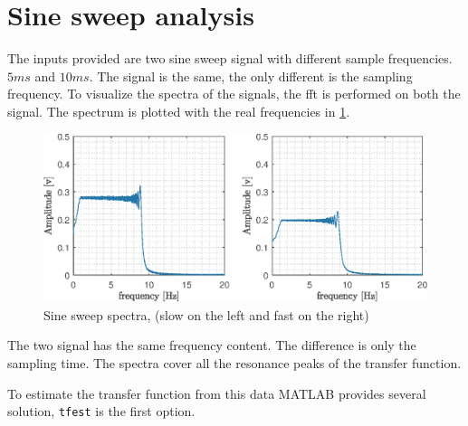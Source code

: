 \documentclass[twosided,a4paper]{article}           %
\begin{document}
\section{Sine sweep analysis}
The inputs provided are two sine sweep signal with different sample frequencies. $5 ms$ and $10 ms$. The signal is the same, the only different is the sampling frequency.
To visualize the spectra of the signals, the fft is performed on both the signal. The spectrum is plotted with the real frequencies in \ref{fig:sinesweepspectra}.
\begin{figure}[H]
	\centering
	\includegraphics[width=\linewidth]{img/sine_sweep_spectra}
	\caption{Sine sweep spectra, (slow on the left and fast on the right)}
	\label{fig:sinesweepspectra}
\end{figure}
\noindent The two signal has the same frequency content. The difference is only the sampling time. The spectra cover all the resonance peaks of the transfer function.

To estimate the transfer function from this data MATLAB provides several solution,
\texttt{tfest} is the first option.









\end{document}
